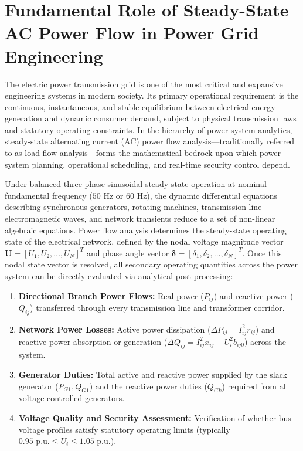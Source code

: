\documentclass[12pt,a4paper,oneside]{report}
\begin{document}
\section{Fundamental Role of Steady-State AC Power Flow in Power Grid Engineering}
The electric power transmission grid is one of the most critical and expansive engineering systems in modern society. Its primary operational requirement is the continuous, instantaneous, and stable equilibrium between electrical energy generation and dynamic consumer demand, subject to physical transmission laws and statutory operating constraints. In the hierarchy of power system analytics, steady-state alternating current (AC) power flow analysis---traditionally referred to as load flow analysis---forms the mathematical bedrock upon which power system planning, operational scheduling, and real-time security control depend.

Under balanced three-phase sinusoidal steady-state operation at nominal fundamental frequency ($50\text{ Hz}$ or $60\text{ Hz}$), the dynamic differential equations describing synchronous generators, rotating machines, transmission line electromagnetic waves, and network transients reduce to a set of non-linear algebraic equations. Power flow analysis determines the steady-state operating state of the electrical network, defined by the nodal voltage magnitude vector $\mathbf{U} = [U_1, U_2, \dots, U_N]^T$ and phase angle vector $\boldsymbol{\delta} = [\delta_1, \delta_2, \dots, \delta_N]^T$. Once this nodal state vector is resolved, all secondary operating quantities across the power system can be directly evaluated via analytical post-processing:
\begin{enumerate}
    \item \textbf{Directional Branch Power Flows:} Real power ($P_{ij}$) and reactive power ($Q_{ij}$) transferred through every transmission line and transformer corridor.
    \item \textbf{Network Power Losses:} Active power dissipation ($\Delta P_{ij} = I_{ij}^2 r_{ij}$) and reactive power absorption or generation ($\Delta Q_{ij} = I_{ij}^2 x_{ij} - U_i^2 b_{ij0}$) across the system.
    \item \textbf{Generator Duties:} Total active and reactive power supplied by the slack generator ($P_{G1}, Q_{G1}$) and the reactive power duties ($Q_{Gk}$) required from all voltage-controlled generators.
    \item \textbf{Voltage Quality and Security Assessment:} Verification of whether bus voltage profiles satisfy statutory operating limits (typically $0.95\text{ p.u.} \le U_i \le 1.05\text{ p.u.}$).
\end{enumerate}
\end{document}
